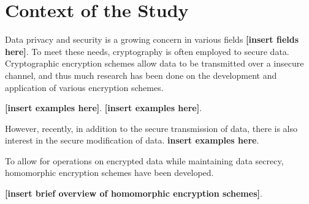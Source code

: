 
\section{Context of the Study}

Data privacy and security is a growing concern in various fields \textbf{[insert fields here]}. To meet these needs, cryptography is often employed to secure data. Cryptographic encryption schemes allow data to be transmitted over a insecure channel, and thus much research has been done on the development and application of various encryption schemes.

\textbf{[insert examples here]}. \textbf{[insert examples here]}.

However, recently, in addition to the secure transmission of data, there is also interest in the secure modification of data. \textbf{insert examples here}.

To allow for operations on encrypted data while maintaining data secrecy, homomorphic encryption schemes have been developed.

\textbf{[insert brief overview of homomorphic encryption schemes]}.

